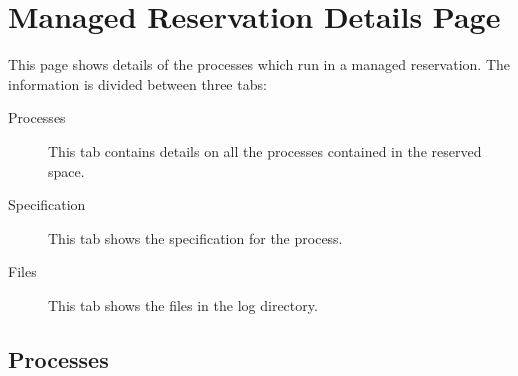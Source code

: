 % 
% 
% 
% 
\section{Managed Reservation Details Page}
\label{sec:ws-managed-reservation-details}

This page shows details of the processes which run in a managed reservation.  The
information is divided between three tabs:

   \begin{description}
       \item[Processes] This tab contains details on all the processes contained in the
         reserved space.
       \item[Specification] This tab shows the specification for the process.
       \item[Files] This tab shows the files in the log directory.
   \end{description}  

   \subsection{Processes}
   \label{sec:ws-manres-processes}

